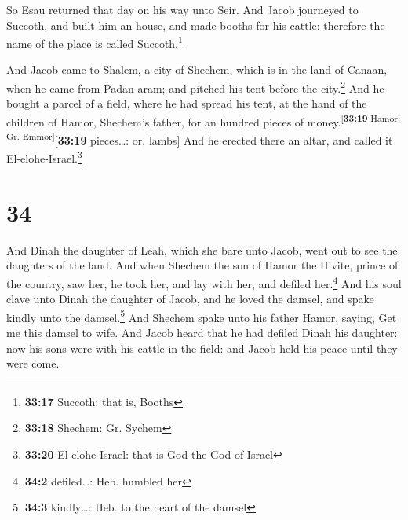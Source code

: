  So Esau returned that day on his way unto Seir.
 And Jacob journeyed to Succoth, and built him an house,
and made booths for his cattle: therefore the name of the place is
called Succoth.\footnote{\textbf{33:17} Succoth: that is, Booths}

 And Jacob came to Shalem, a city of Shechem, which is in
the land of Canaan, when he came from Padan-aram; and pitched his tent
before the city.\footnote{\textbf{33:18} Shechem: Gr. Sychem}
 And he bought a parcel of a field, where he had spread
his tent, at the hand of the children of Hamor, Shechem's father, for an
hundred pieces of money.\textsuperscript{{[}\textbf{33:19} Hamor: Gr.
Emmor{]}}{[}\textbf{33:19} pieces\ldots: or, lambs{]} 
And he erected there an altar, and called it El-elohe-Israel.\footnote{\textbf{33:20}
  El-elohe-Israel: that is God the God of Israel}

\hypertarget{section-33}{%
\section{34}\label{section-33}}

 And Dinah the daughter of Leah, which she bare unto
Jacob, went out to see the daughters of the land.  And
when Shechem the son of Hamor the Hivite, prince of the country, saw
her, he took her, and lay with her, and defiled her.\footnote{\textbf{34:2}
  defiled\ldots: Heb. humbled her}  And his soul clave
unto Dinah the daughter of Jacob, and he loved the damsel, and spake
kindly unto the damsel.\footnote{\textbf{34:3} kindly\ldots: Heb. to the
  heart of the damsel}  And Shechem spake unto his father
Hamor, saying, Get me this damsel to wife.  And Jacob
heard that he had defiled Dinah his daughter: now his sons were with his
cattle in the field: and Jacob held his peace until they were come.


